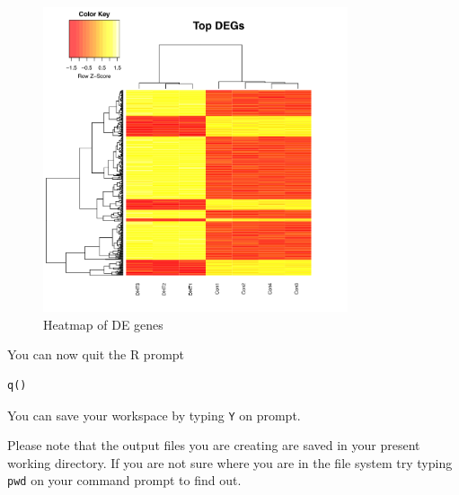 \begin{steps}
\begin{figure}[H]
\centering
\includegraphics[width=0.8\textwidth]{handout/Heatmap.png}
\caption{Heatmap of DE genes}
\label{fig:Heatmap}
\end{figure}


You can now quit the R prompt
\begin{lstlisting}
q()
\end{lstlisting}
\end{steps}
You can save your workspace by typing \texttt{Y} on prompt.
\begin{note}
Please note that the output files you are creating are saved in your present working directory. If you are not sure where you are in the file system try typing \texttt{pwd} on your command prompt to find out.
\end{note}



